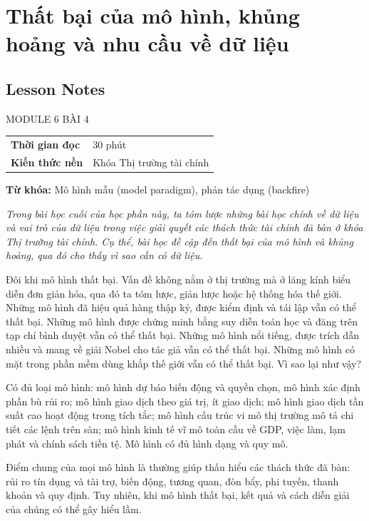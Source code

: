 \chapter{Thất bại của mô hình, khủng hoảng và nhu cầu về dữ liệu}
\label{ch:M6L4LessonNotes}

\section*{Lesson Notes}

MODULE 6 \textbar{} BÀI 4

{\small
\begin{longtable}[]{@{}ll@{}}
\toprule\noalign{}
\endhead
\bottomrule\noalign{}
\endlastfoot
\textbf{Thời gian đọc} & 30 phút \\
\textbf{Kiến thức nền} & Khóa Thị trường tài chính \\
\end{longtable}
}

\textbf{Từ khóa:} Mô hình mẫu (model paradigm), phản tác dụng (backfire)

\emph{Trong bài học cuối của học phần này, ta tóm lược những bài học chính về dữ liệu và vai trò của dữ liệu trong việc giải quyết các thách thức tài chính đã bàn ở khóa Thị trường tài chính. Cụ thể, bài học đề cập đến thất bại của mô hình và khủng hoảng, qua đó cho thấy vì sao cần có dữ liệu.}

Đôi khi mô hình thất bại. Vấn đề không nằm ở thị trường mà ở lăng kính biểu diễn đơn giản hóa, qua đó ta tóm lược, giản lược hoặc hệ thống hóa thế giới. Những mô hình đã hiệu quả hàng thập kỷ, được kiểm định và tái lập vẫn có thể thất bại. Những mô hình được chứng minh bằng suy diễn toán học và đăng trên tạp chí bình duyệt vẫn có thể thất bại. Những mô hình nổi tiếng, được trích dẫn nhiều và mang về giải Nobel cho tác giả vẫn có thể thất bại. Những mô hình có mặt trong phần mềm dùng khắp thế giới vẫn có thể thất bại. Vì sao lại như vậy?

Có đủ loại mô hình: mô hình dự báo biến động và quyền chọn, mô hình xác định phần bù rủi ro; mô hình giao dịch theo giá trị, ít giao dịch; mô hình giao dịch tần suất cao hoạt động trong tích tắc; mô hình cấu trúc vi mô thị trường mô tả chi tiết các lệnh trên sàn; mô hình kinh tế vĩ mô toàn cầu về GDP, việc làm, lạm phát và chính sách tiền tệ. Mô hình có đủ hình dạng và quy mô.

Điểm chung của mọi mô hình là thường giúp thấu hiểu các thách thức đã bàn: rủi ro tín dụng và tài trợ, biến động, tương quan, đòn bẩy, phi tuyến, thanh khoản và quy định. Tuy nhiên, khi mô hình thất bại, kết quả và cách diễn giải của chúng có thể gây hiểu lầm.

